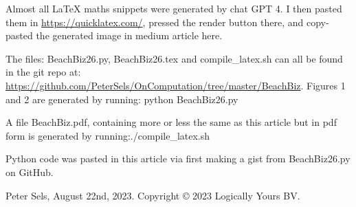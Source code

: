 \documentclass[11pt, a4paper]{article}
\begin{document}
Almost all LaTeX maths snippets were generated by chat GPT 4.
I then pasted them in
\href{https://quicklatex.com/}{https://quicklatex.com/}, pressed the render button there,
and copy-pasted the generated image in medium article here.

The files: BeachBiz26.py, BeachBiz26.tex and compile\_latex.sh can all be found in the git repo
at:
\newline
\href{https://github.com/PeterSels/OnComputation/tree/master/BeachBiz}{https://github.com/PeterSels/OnComputation/tree/master/BeachBiz}.
Figures 1 and 2 are generated by running: python BeachBiz26.py

A file BeachBiz.pdf, containing more or less the same as this article but in pdf form
is generated by running:./compile\_latex.sh

Python code was pasted in this article via first making a gist from BeachBiz26.py on GitHub.

Peter Sels, August 22nd, 2023.
Copyright © 2023 Logically Yours BV.

\printindex
\end{document}
